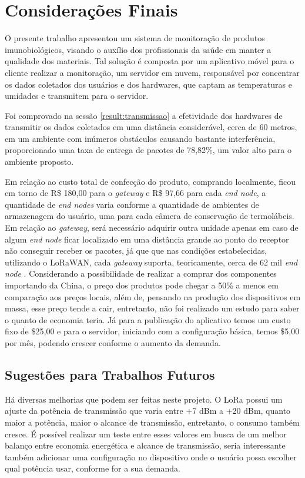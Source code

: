 \chapter{Considerações Finais}
\label{cap:conclusao}
O presente trabalho apresentou um sistema de monitoração de produtos imunobiológicos, visando o auxílio dos profissionais da saúde em manter a qualidade dos materiais. Tal solução é composta por um aplicativo móvel para o cliente realizar a monitoração, um servidor em nuvem, responsável por concentrar os dados coletados dos usuários e dos hardwares, que captam as temperaturas e umidades e transmitem para o servidor.

Foi comprovado na sessão \ref{result:transmissao} a efetividade dos hardwares de transmitir os dados coletados em uma distância considerável, cerca de 60 metros, em um ambiente com inúmeros obstáculos causando bastante interferência, proporcionado uma taxa de entrega de pacotes de 78,82\%, um valor alto para o ambiente proposto.
 
Em relação ao custo total de confecção do produto, comprando localmente, ficou  em torno de R\$ 180,00 para o \textit{gateway} e R\$ 97,66 para cada \textit{end node}, a quantidade de \textit{end nodes}  varia conforme a quantidade de ambientes de armazenagem do usuário, uma para cada câmera de conservação de termolábeis. Em relação ao \textit{gateway}, será necessário adquirir outra unidade apenas em caso de algum \textit{end node} ficar localizado em uma distância grande ao ponto do receptor não conseguir receber os pacotes, já que que nas condições estabelecidas, utilizando o LoRaWAN, cada \textit{gateway} suporta, teoricamente, cerca de 62 mil \textit{end node} \cite{lora2021specification}. Considerando a possibilidade de realizar a comprar dos componentes importando da China, o preço dos produtos pode chegar a 50\% a menos em comparação aos preços locais, além de, pensando na produção dos dispositivos em massa, esse preço tende a cair, entretanto, não foi realizado um estudo para saber o quanto de economia teria. Já para a publicação do aplicativo temos um custo fixo de \$25,00 e para o servidor, iniciando com a configuração básica, temos \$5,00 por mês, podendo crescer conforme o aumento da demanda.


\section{Sugestões para Trabalhos Futuros}
\label{conclusao:futuros}
Há diversas melhorias que podem ser feitas neste projeto. O LoRa possui um ajuste da potência de transmissão que varia entre +7 dBm a +20 dBm, quanto maior a potência, maior o alcance de transmissão, entretanto, o consumo também cresce. É possível realizar um teste entre esses valores em busca de um melhor balanço entre economia energética e alcance de transmissão, seria interessante também adicionar uma configuração no dispositivo onde o usuário possa escolher qual potência usar, conforme for a sua demanda.

